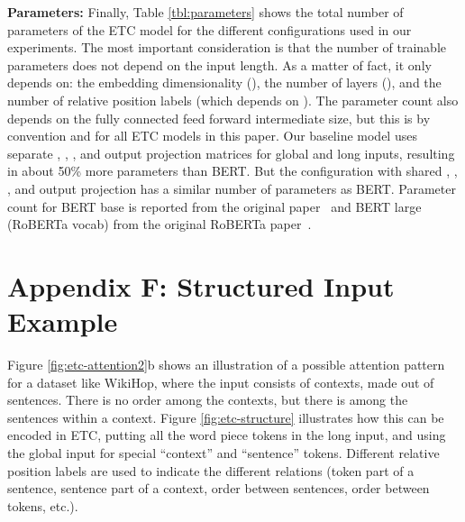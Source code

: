 \documentclass[11pt,a4paper]{article}
\begin{document}
{\bf Parameters:} Finally, Table \ref{tbl:parameters} shows the total number of parameters of the ETC model for the different configurations used in our experiments. The most important consideration is that the number of trainable parameters does not depend on the input length. As a matter of fact, it only depends on: the embedding dimensionality (), the number of layers (), and the number of relative position labels (which depends on ).
The parameter count also depends on the fully connected feed forward intermediate size, but this is  by convention and for all ETC models in this paper. Our baseline model uses separate , , , and output projection matrices for global and long inputs, resulting in about 50\% more parameters than BERT. But the configuration with shared  , , , and output projection has a similar number of parameters as BERT. Parameter count for BERT base is reported from the original paper~\cite{devlin2018bert} and BERT large (RoBERTa vocab) from the original RoBERTa paper~\cite{liu2019roberta}.









\section*{Appendix F: Structured Input Example}\label{app:structure}

Figure \ref{fig:etc-attention2}b shows an illustration of a possible attention pattern for a dataset like WikiHop, where the input consists of contexts, made out of sentences. There is no order among the contexts, but there is among the sentences within a context. Figure \ref{fig:etc-structure} illustrates how this can be encoded in ETC, putting all the word piece tokens in the long input, and using the global input for special ``context'' and ``sentence'' tokens. Different relative position labels are used to indicate the different relations (token part of a sentence, sentence part of a context, order between sentences, order between tokens, etc.).
\end{document}
